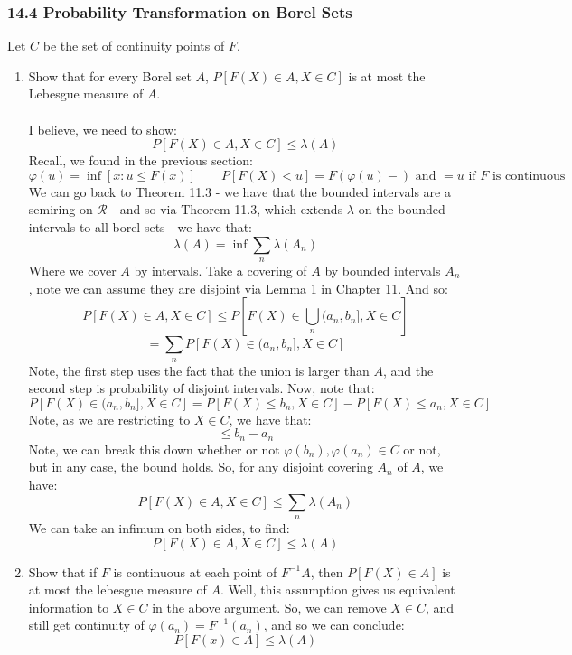 \documentclass[12pt,a4paper]{article}
\newcommand{\1}[1]{\mathbbm{1}\left\{ #1 \right\}}
\newcommand{\rcal}{\mathcal{R}}
\begin{document}
\subsubsection{14.4 Probability Transformation on Borel Sets} Let $C$ be the set of continuity points of $F$.
\begin{enumerate}
	\item Show that for every Borel set $A$, $P[F(X) \in A, X \in C]$ is at most the Lebesgue measure of $A$.
	\\\\
	I believe, we need to show:
	$$
		P[F(X) \in A, X \in C] \leq \lambda(A)
	$$
	Recall, we found in the previous section:
	$$
		\varphi(u) = \inf\left[x : u \leq F(x)\right] \quad\quad
		P\left[F(X) < u\right] = F(\varphi(u)-) \text{ and $= u$ if $F$ is continuous}
	$$
	We can go back to Theorem 11.3 - we have that the bounded intervals are a semiring on $\rcal$ - and so via Theorem 11.3, which extends $\lambda$ on the bounded intervals to all borel sets - we have that:
	$$
		\lambda(A) = \inf \sum_n \lambda(A_n)
	$$
	Where we cover $A$ by intervals. Take a covering of $A$ by bounded intervals $A_n$, note we can assume they are disjoint via Lemma 1 in Chapter 11. And so:
	$$
		P[F(X) \in A, X \in C] \leq P\left[F(X) \in \bigcup_n (a_n,b_n], X \in C\right]
	$$
	$$
		= \sum_n P\left[F(X) \in (a_n,b_n], X \in C\right]
	$$
	Note, the first step uses the fact that the union is larger than $A$, and the second step is probability of disjoint intervals. Now, note that:
	$$
		P\left[F(X) \in (a_n,b_n], X \in C\right] =
		P\left[F(X) \leq b_n, X \in C\right] - P\left[F(X) \leq a_n, X \in C\right]
	$$
	Note, as we are restricting to $X \in C$, we have that:
	$$
		\leq b_n - a_n
	$$
	Note, we can break this down whether or not $\varphi(b_n), \varphi(a_n) \in C$ or not, but in any case, the bound holds. So, for any disjoint covering $A_n$ of $A$, we have:
	$$
		P[F(X) \in A, X \in C] \leq \sum_n \lambda(A_n)
	$$
	We can take an infimum on both sides, to find:
	$$
		P[F(X) \in A, X \in C] \leq \lambda(A)
	$$
	
	\item Show that if $F$ is continuous at each point of $F^{-1}A$, then $P[F(X) \in A]$ is at most the lebesgue measure of $A$. Well, this assumption gives us equivalent information to $X \in C$ in the above argument. So, we can remove $X \in C$, and still get continuity of $\varphi(a_n) = F^{-1}(a_n)$, and so we can conclude:
	$$
		P[F(x) \in A] \leq \lambda(A)
	$$
	
\end{enumerate}
\end{document}
